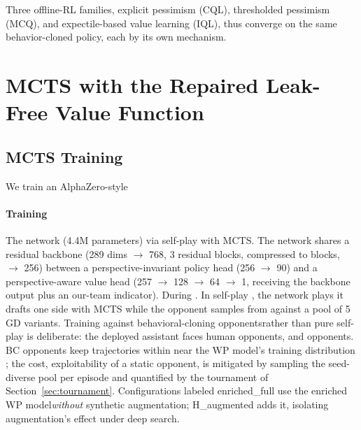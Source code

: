 \documentclass[journal]{IEEEtran}
\providecommand{\DIFaddtex}[1]{{\protect\color{blue} \sf #1}} %
\providecommand{\DIFdeltex}[1]{{\protect\color{red} \scriptsize #1}} %
\providecommand{\DIFaddbegin}{} %
\providecommand{\DIFaddend}{} %
\providecommand{\DIFdelbegin}{} %
\providecommand{\DIFdelend}{} %
\providecommand{\DIFadd}[1]{\texorpdfstring{\DIFaddtex{#1}}{#1}} %
\providecommand{\DIFdel}[1]{\texorpdfstring{\DIFdeltex{#1}}{}} %
\begin{document}
\DIFdelbegin \DIFdel{Three offline-RL families, explicit pessimism (CQL), thresholded pessimism (MCQ), and expectile-based value learning (IQL), thus converge on the same behavior-cloned policy, each by its own mechanism.
}%

\DIFdelend \section{MCTS with the \DIFdelbegin \DIFdel{Repaired }\DIFdelend \DIFaddbegin \DIFadd{Leak-Free }\DIFaddend Value Function}
\label{sec:mcts}

\DIFdelbegin \subsection{\DIFdel{MCTS Training}}
\addtocounter{subsection}{-1}%

\DIFdel{We train an AlphaZero-style }\DIFdelend \DIFaddbegin \paragraph{\DIFadd{Training}} \DIFadd{The }\DIFaddend network (4.4M parameters) \DIFdelbegin \DIFdel{via self-play with MCTS. The network }\DIFdelend shares a residual backbone (289 \DIFdelbegin \DIFdel{dims }\DIFdelend $\to$ 768, 3 \DIFdelbegin \DIFdel{residual blocks, compressed to }\DIFdelend \DIFaddbegin \DIFadd{blocks, $\to$ }\DIFaddend 256) between a perspective-invariant policy head \DIFdelbegin \DIFdel{(256 $\to$ 90) }\DIFdelend and a perspective-aware value head\DIFdelbegin \DIFdel{(257 $\to$ 128 $\to$ 64 $\to$ 1, receiving the backbone output plus an our-team indicator). During }\DIFdelend \DIFaddbegin \DIFadd{. In }\DIFaddend self-play \DIFdelbegin \DIFdel{, the network plays }\DIFdelend \DIFaddbegin \DIFadd{it drafts }\DIFaddend one side with MCTS \DIFdelbegin \DIFdel{while the opponent samples from }\DIFdelend \DIFaddbegin \DIFadd{against }\DIFaddend a pool of 5 GD \DIFdelbegin \DIFdel{variants. Training against behavioral-cloning opponentsrather than pure self-play is deliberate: the deployed assistant faces human opponents, and }\DIFdelend \DIFaddbegin \DIFadd{opponents. }\DIFaddend BC opponents keep trajectories \DIFdelbegin \DIFdel{within }\DIFdelend \DIFaddbegin \DIFadd{near }\DIFaddend the WP model's training distribution \DIFdelbegin \DIFdel{; the cost, exploitability of a static opponent, is mitigated by sampling the seed-diverse pool per episode and quantified by the tournament of Section~\ref{sec:tournament}. Configurations labeled enriched\_full use the enriched WP model\textit{without} synthetic augmentation; H\_augmented adds it, isolating augmentation's effect under deep search.
}%
\end{document}
